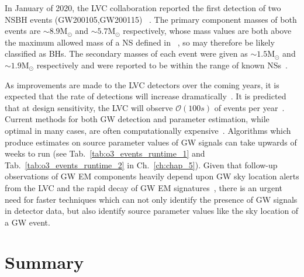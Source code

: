 %
%
In January of 2020, the \ac{LVC} collaboration reported the 
first detection of two  \ac{NSBH} events (GW200105,GW200115)~\cite{Abbott_2021}
. The primary component masses of both events are $\sim 8.9 \mathrm{M}_\odot$ 
and $\sim 5.7 \mathrm{M}_\odot$ respectively, whose mass values are both  
above the maximum allowed mass of a \ac{NS} defined 
in ~\cite{1974PhRvL..32..324R}, 
so may therefore be likely classified as \ac{BH}s. The secondary masses 
of each event were given as $\sim 1.5 \mathrm{M}_\odot$ and $\sim 1.9 \mathrm{M}_\odot$ respectively and were reported to be within the range of 
known \ac{NS}s~\cite{2016arXiv160501665A}.  

%
%
As improvements are made to the \ac{LVC} detectors over the coming years, 
it is expected that the rate of detections will increase
dramatically~\cite{2018LRR....21....3A}. It is 
predicted that at design sensitivity, the 
\ac{LVC} will observe $\mathcal{O}(100s)$ of events 
per year~\cite{2018LRR....21....3A}. Current 
methods for both \ac{GW} detection and parameter estimation, 
while optimal in many cases, are often computationally expensive~\cite{}. 
Algorithms which produce estimates on source parameter values of 
\ac{GW} signals can take upwards of weeks to run (see Tab.~\ref{tab:o3_events_runtime_1} and
Tab.~\ref{tab:o3_events_runtime_2} in Ch.~\ref{ch:chap_5}).
Given that follow-up observations of \ac{GW} \ac{EM} components 
heavily depend upon \ac{GW} sky location alerts 
from the \ac{LVC} and 
the rapid decay of \ac{GW} \ac{EM} signatures~\cite{2017arXiv171005833L}, 
there is an urgent need for faster techniques which can not only 
identify the presence of \ac{GW} signals in detector data, 
but also identify source parameter values like the sky location 
of a \ac{GW} event. 

% 
%

\section{Summary}

